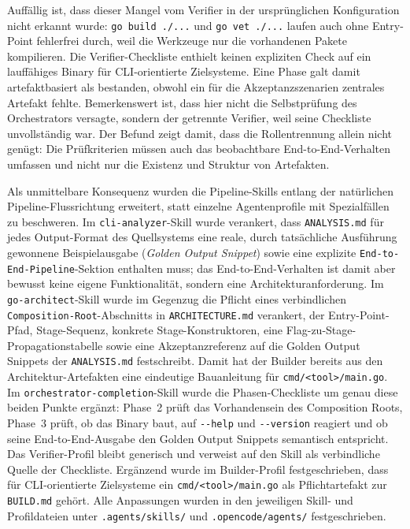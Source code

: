 Auffällig ist, dass dieser Mangel vom Verifier in der ursprünglichen Konfiguration nicht erkannt wurde: \texttt{go build ./...} und \texttt{go vet ./...} laufen auch ohne Entry-Point fehlerfrei durch, weil die Werkzeuge nur die vorhandenen Pakete kompilieren. Die Verifier-Checkliste enthielt keinen expliziten Check auf ein lauffähiges Binary für CLI-orientierte Zielsysteme. Eine Phase galt damit artefaktbasiert als bestanden, obwohl ein für die Akzeptanzszenarien zentrales Artefakt fehlte. Bemerkenswert ist, dass hier nicht die Selbstprüfung des Orchestrators versagte, sondern der getrennte Verifier, weil seine Checkliste unvollständig war. Der Befund zeigt damit, dass die Rollentrennung allein nicht genügt: Die Prüfkriterien müssen auch das beobachtbare End-to-End-Verhalten umfassen und nicht nur die Existenz und Struktur von Artefakten.

Als unmittelbare Konsequenz wurden die Pipeline-Skills entlang der natürlichen Pipeline-Flussrichtung erweitert, statt einzelne Agentenprofile mit Spezialfällen zu beschweren. Im \texttt{cli-analyzer}-Skill wurde verankert, dass \texttt{ANALYSIS.md} für jedes Output-Format des Quellsystems eine reale, durch tatsächliche Ausführung gewonnene Beispielausgabe (\emph{Golden Output Snippet}) sowie eine explizite \texttt{End-to-End-Pipeline}-Sektion enthalten muss; das End-to-End-Verhalten ist damit aber bewusst keine eigene Funktionalität, sondern eine Architekturanforderung. Im \texttt{go-architect}-Skill wurde im Gegenzug die Pflicht eines verbindlichen \texttt{Composition-Root}-Abschnitts in \texttt{ARCHITECTURE.md} verankert, der Entry-Point-Pfad, Stage-Sequenz, konkrete Stage-Konstruktoren, eine Flag-zu-Stage-Propagationstabelle sowie eine Akzeptanzreferenz auf die Golden Output Snippets der \texttt{ANALYSIS.md} festschreibt. Damit hat der Builder bereits aus den Architektur-Artefakten eine eindeutige Bauanleitung für \texttt{cmd/<tool>/main.go}. Im \texttt{orchestrator-completion}-Skill wurde die Phasen-Checkliste um genau diese beiden Punkte ergänzt: Phase~2 prüft das Vorhandensein des Composition Roots, Phase~3 prüft, ob das Binary baut, auf \texttt{-{}-help} und \texttt{-{}-version} reagiert und ob seine End-to-End-Ausgabe den Golden Output Snippets semantisch entspricht. Das Verifier-Profil bleibt generisch und verweist auf den Skill als verbindliche Quelle der Checkliste. Ergänzend wurde im Builder-Profil festgeschrieben, dass für CLI-orientierte Zielsysteme ein \texttt{cmd/<tool>/main.go} als Pflichtartefakt zur \texttt{BUILD.md} gehört. Alle Anpassungen wurden in den jeweiligen Skill- und Profildateien unter \texttt{.agents/skills/} und \texttt{.opencode/agents/} festgeschrieben.

